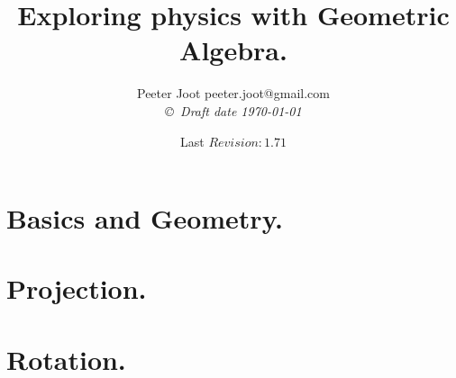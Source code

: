 \documentclass[12pt,leqno]{book}
\date{ Last $Revision: 1.71 $ }
\begin{document}

\title{Exploring physics with Geometric Algebra.}
\author{Peeter Joot  \quad peeter.joot@gmail.com \\
{\small\em \copyright \  Draft date \today }}

\maketitle
\renewcommand{\title}[1]{\chapter{}}

\clearpage{}
\tableofcontents
\listoffigures
\listoftables

\clearpage{}

\pagestyle{plain}





\part{Basics and Geometry.}



















\part{Projection.}







\part{Rotation.}





\end{document}
